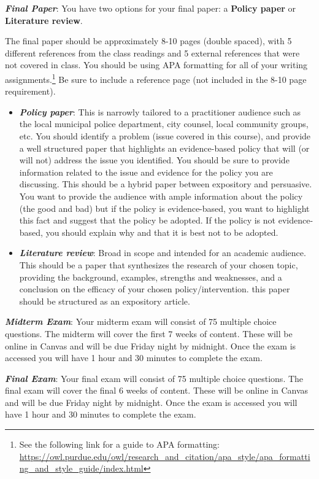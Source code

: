 \documentclass[11pt,]{article}
\begin{document}
\textbf{\emph{Final Paper}}: You have two options for your final paper:
a \textbf{Policy paper} or \textbf{Literature review}.

The final paper should be approximately 8-10 pages (double spaced), with
5 different references from the class readings and 5 external references
that were not covered in class. You should be using APA formatting for
all of your writing assignments.\footnote{See the following link for a
  guide to APA formatting:
  \url{https://owl.purdue.edu/owl/research_and_citation/apa_style/apa_formatting_and_style_guide/index.html}}
Be sure to include a reference page (not included in the 8-10 page
requirement).

\begin{itemize}
\item
  \textbf{\emph{Policy paper}}: This is narrowly tailored to a
  practitioner audience such as the local municipal police department,
  city counsel, local community groups, etc. You should identify a
  problem (issue covered in this course), and provide a well structured
  paper that highlights an evidence-based policy that will (or will not)
  address the issue you identified. You should be sure to provide
  information related to the issue and evidence for the policy you are
  discussing. This should be a hybrid paper between expository and
  persuasive. You want to provide the audience with ample information
  about the policy (the good and bad) but if the policy is
  evidence-based, you want to highlight this fact and suggest that the
  policy be adopted. If the policy is not evidence-based, you should
  explain why and that it is best not to be adopted.
\item
  \textbf{\emph{Literature review}}: Broad in scope and intended for an
  academic audience. This should be a paper that synthesizes the
  research of your chosen topic, providing the background, examples,
  strengths and weaknesses, and a conclusion on the efficacy of your
  chosen policy/intervention. this paper should be structured as an
  expository article.
\end{itemize}

\textbf{\emph{Midterm Exam}}: Your midterm exam will consist of 75
multiple choice questions. The midterm will cover the first 7 weeks of
content. These will be online in Canvas and will be due Friday night by
midnight. Once the exam is accessed you will have 1 hour and 30 minutes
to complete the exam.

\textbf{\emph{Final Exam}}: Your final exam will consist of 75 multiple
choice questions. The final exam will cover the final 6 weeks of
content. These will be online in Canvas and will be due Friday night by
midnight. Once the exam is accessed you will have 1 hour and 30 minutes
to complete the exam.
\end{document}
